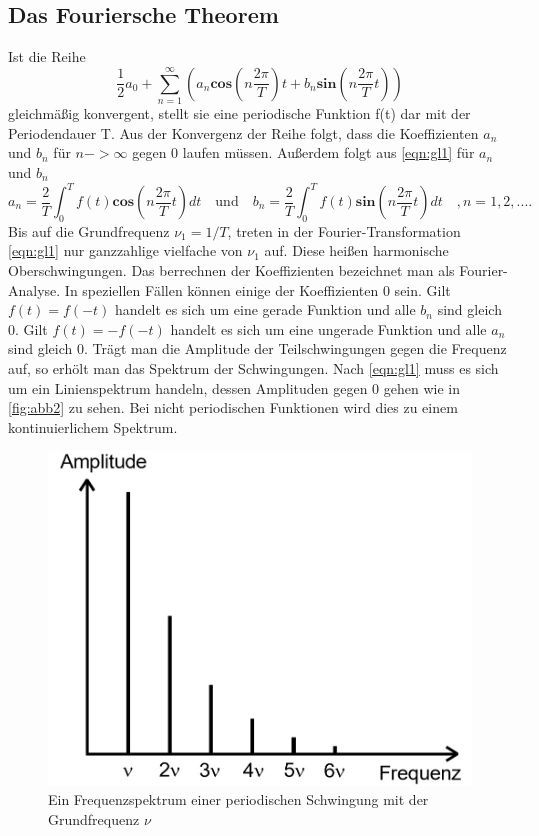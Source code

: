 \subsection{Das Fouriersche Theorem}
\label{sec:Fouriersche Theorem}
Ist die Reihe
\begin{equation}
  \frac{1}{2} a_0 + \sum_{n = 1}^{\infty} \left( a_n \symbf{cos} (n \frac{2 \pi}{T} )t + b_n \symbf{sin} (n \frac{2 \pi}{T} t) \right)
  \label{eqn:gl1}
\end{equation}
gleichmäßig konvergent, stellt sie eine periodische Funktion f(t) dar mit der Periodendauer T.
Aus der Konvergenz der Reihe folgt, dass die Koeffizienten $a_n$ und $b_n$ für $n -> \infty$ gegen 0 laufen müssen.
Außerdem folgt aus \ref{eqn:gl1} für $a_n$ und $b_n$
\begin{equation}
  a_n = \frac{2}{T} \int_0^T f(t) \symbf{cos} (n \frac{2 \pi}{T} t) dt \quad
  \textrm{und} \quad
  b_n = \frac{2}{T} \int_0^T f(t) \symbf{sin} (n \frac{2 \pi}{T} t) dt \quad
  ,n= 1, 2, ....
  \label{eqn:gl2}
\end{equation}
Bis auf die Grundfrequenz $\nu_1 = 1/T$, treten in der Fourier-Transformation \ref{eqn:gl1} nur ganzzahlige vielfache von $\nu_1$ auf.
Diese heißen harmonische Oberschwingungen.
Das berrechnen der Koeffizienten bezeichnet man als Fourier-Analyse.
In speziellen Fällen können einige der Koeffizienten 0 sein.
Gilt $f(t) = f(-t)$ handelt es sich um eine gerade Funktion und alle $b_n$ sind gleich 0.
Gilt $f(t) = -f(-t)$ handelt es sich um eine ungerade Funktion und alle $a_n$ sind gleich 0.
Trägt man die Amplitude der Teilschwingungen gegen die Frequenz auf, so erhölt man das Spektrum der Schwingungen.
Nach \ref{eqn:gl1} muss es sich um ein Linienspektrum handeln, dessen Amplituden gegen 0 gehen wie in \ref{fig:abb2} zu sehen.
Bei nicht periodischen Funktionen wird dies zu einem kontinuierlichem Spektrum.
\begin{figure}
  \centering
  \includegraphics[width=\textwidth]{abb1.jpg}
  \caption{Ein Frequenzspektrum einer periodischen Schwingung mit der Grundfrequenz $\nu$}
  \label{fig:abb1}
\end{figure}

